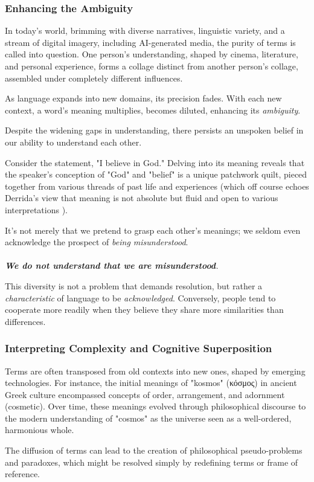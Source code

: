 \documentclass[11pt,a4]{article}
\newcommand{\textgreek}[1]{\begingroup\fontencoding{LGR}\selectfont#1\endgroup}
\begin{document}
    \subsubsection{Enhancing the Ambiguity}
        \par
        In today's world, brimming with diverse narratives, linguistic variety, and a stream of digital imagery, including AI-generated media, the purity of terms is called into question. One person's understanding, shaped by cinema, literature, and personal experience, forms a collage distinct from another person's collage, assembled under completely different influences.
        \par
        As language expands into new domains, its precision fades. With each new context, a word's meaning multiplies, becomes diluted, enhancing its \textit{ambiguity}.




        Despite the widening gaps in understanding, there persists an unspoken belief in our ability to understand each other.

        Consider the statement, "I believe in God." Delving into its meaning reveals that the speaker's conception of "God" and "belief" is a unique patchwork quilt, pieced together from various threads of past life and experiences (which off course echoes Derrida's view that meaning is not absolute but fluid and open to various interpretations \cite{Deconstruction}).

        \par
        It's not merely that we pretend to grasp each other's meanings; we seldom even acknowledge the prospect of \textit{being misunderstood}. \\
        \\
        \textit{\textbf{We do not understand that we are misunderstood}.}  \\

        \par
        This diversity is not a problem that demands resolution, but rather a \textit{characteristic} of language to be \textit{acknowledged}. Conversely, people tend to cooperate more readily when they believe they share more similarities than differences.

    \subsubsection{Interpreting Complexity and Cognitive Superposition}
        \par
        Terms are often transposed from old contexts into new ones, shaped by emerging technologies.
        For instance,  the initial meanings of "kosmos" (\textgreek{κόσμος}) in ancient Greek culture encompassed concepts of order, arrangement, and adornment (cosmetic). Over time, these meanings evolved through philosophical discourse to the modern understanding of "cosmos" as the universe seen as a well-ordered, harmonious whole.
        \par
        The diffusion of  terms can lead to the creation of philosophical pseudo-problems and paradoxes, which might be resolved simply by redefining terms or frame of reference.
        \par
\end{document}
